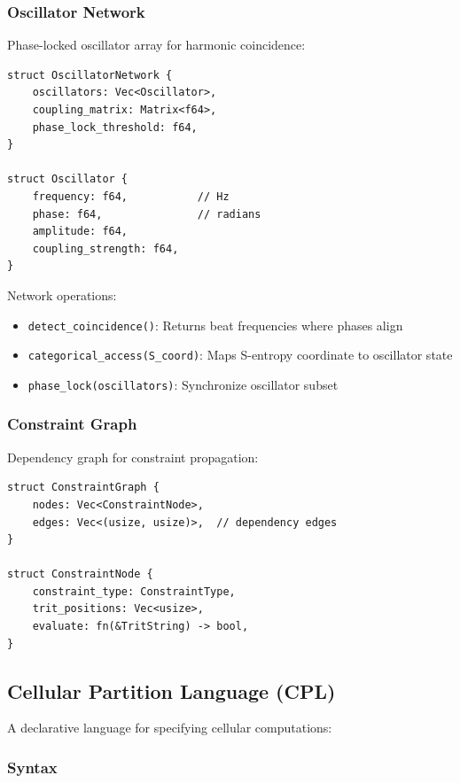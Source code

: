 \subsubsection{Oscillator Network}

Phase-locked oscillator array for harmonic coincidence:

\begin{verbatim}
struct OscillatorNetwork {
    oscillators: Vec<Oscillator>,
    coupling_matrix: Matrix<f64>,
    phase_lock_threshold: f64,
}

struct Oscillator {
    frequency: f64,           // Hz
    phase: f64,               // radians
    amplitude: f64,
    coupling_strength: f64,
}
\end{verbatim}

Network operations:
\begin{itemize}
\item \texttt{detect\_coincidence()}: Returns beat frequencies where phases align
\item \texttt{categorical\_access(S\_coord)}: Maps S-entropy coordinate to oscillator state
\item \texttt{phase\_lock(oscillators)}: Synchronize oscillator subset
\end{itemize}

\subsubsection{Constraint Graph}

Dependency graph for constraint propagation:

\begin{verbatim}
struct ConstraintGraph {
    nodes: Vec<ConstraintNode>,
    edges: Vec<(usize, usize)>,  // dependency edges
}

struct ConstraintNode {
    constraint_type: ConstraintType,
    trit_positions: Vec<usize>,
    evaluate: fn(&TritString) -> bool,
}
\end{verbatim}

\subsection{Cellular Partition Language (CPL)}

A declarative language for specifying cellular computations:

\subsubsection{Syntax}

